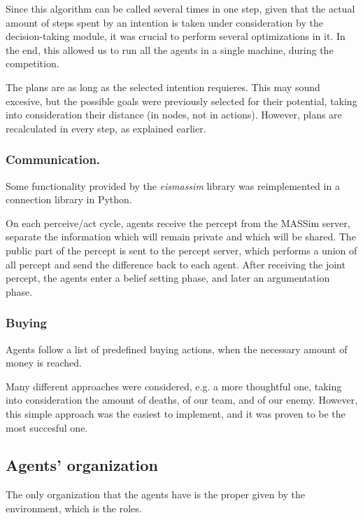 \documentclass{llncs2e/llncs}
\begin{document}
    Since this algorithm can be called several times in one step, given that the 
    actual amount of steps spent by an intention is taken under consideration by 
    the decision-taking module, it was crucial to perform several optimizations in 
    it. In the end, this allowed us to run all the agents in a single machine, 
    during the competition.
    
    The plans are as long as the selected intention requieres. This may 
    sound excesive, but the possible goals were previously selected for their 
    potential, taking into consideration their distance (in nodes, not in 
    actions). However, plans are recalculated in every step, as explained earlier.

\subsubsection{Communication.}

    Some functionality provided by the \textit{eismassim} library was
    reimplemented in a connection library in Python.

    On each perceive/act cycle, agents receive the percept from the MASSim server, 
    separate the information which will remain private and which will be shared. 
    The public part of the percept is sent to the percept server, which performs a 
    union of all percept and send the difference back to each agent. After 
    receiving the joint percept, the agents enter a belief setting phase, and 
    later an argumentation phase.
    
\subsubsection{Buying}

    Agents follow a list of predefined buying actions, when the necessary amount 
    of money is reached.
    
    Many different approaches were considered, e.g. a more thoughtful one, taking
    into consideration the amount of deaths, of our team, and of our enemy.
    However, this simple approach was the easiest to implement, and it was
    proven to be the most succesful one.

\subsection{Agents' organization}

    The only organization that the agents have is the proper given by the 
    environment, which is the roles. 
    
\end{document}
